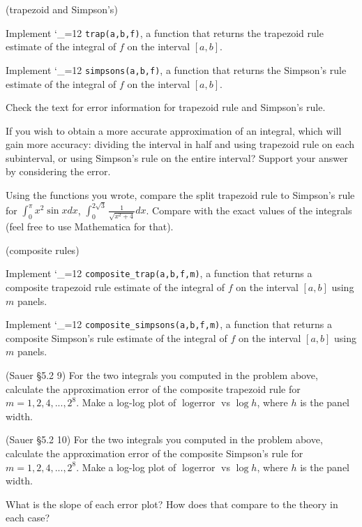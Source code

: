 \documentclass[12pt,letterpaper,noanswers]{exam}
\makeatletter
\newcommand{\pyf}{%
  \begingroup\catcode`_=12
  \pyf@
}
\newcommand{\pyf@}[1]{\texttt{#1}\endgroup}
\makeatother
\begin{document}
\begin{questions}
\item (trapezoid and Simpson's)
\begin{parts}
\item Implement \pyf{trap(a,b,f)}, a function that returns the trapezoid rule estimate of the integral of $f$ on the interval $[a,b]$.
\item Implement \pyf{simpsons(a,b,f)}, a function that returns the Simpson's rule estimate of the integral of $f$ on the interval $[a,b]$.
\item Check the text for error information for trapezoid rule and Simpson's rule.

If you wish to obtain a more accurate approximation of an integral, which will gain more accuracy: dividing the interval in half and using trapezoid rule on each subinterval, or using Simpson's rule on the entire interval?  Support your answer by considering the error.

\item Using the functions you wrote, compare the split trapezoid rule to Simpson's rule for $\int_0^{\pi} x^2\sin x dx$, $\int_0^{2\sqrt{3}} \frac{1}{\sqrt{x^2+4}}dx$.  Compare with the exact values of the integrals (feel free to use Mathematica for that).
\end{parts}

\item (composite rules)
\begin{parts}
\item Implement \pyf{composite_trap(a,b,f,m)}, a function that returns a composite trapezoid rule estimate of the integral of $f$ on the interval $[a,b]$ using $m$ panels.
\item Implement \pyf{composite_simpsons(a,b,f,m)}, a function that returns a composite Simpson's rule estimate of the integral of $f$ on the interval $[a,b]$ using $m$ panels.
\item (Sauer \S 5.2 9) For the two integrals you computed in the problem above, calculate the approximation error of the composite trapezoid rule for $m = 1, 2, 4, ..., 2^8$.  Make a log-log plot of $\log \text{error}$ vs $\log h$, where $h$ is the panel width.
\item (Sauer \S 5.2 10) For the two integrals you computed in the problem above, calculate the approximation error of the composite Simpson's rule for $m = 1, 2, 4, ..., 2^8$.  Make a log-log plot of $\log \text{error}$ vs $\log h$, where $h$ is the panel width.
\item What is the slope of each error plot?  How does that compare to the theory in each case?


\end{parts}
\end{questions}
\end{document}
